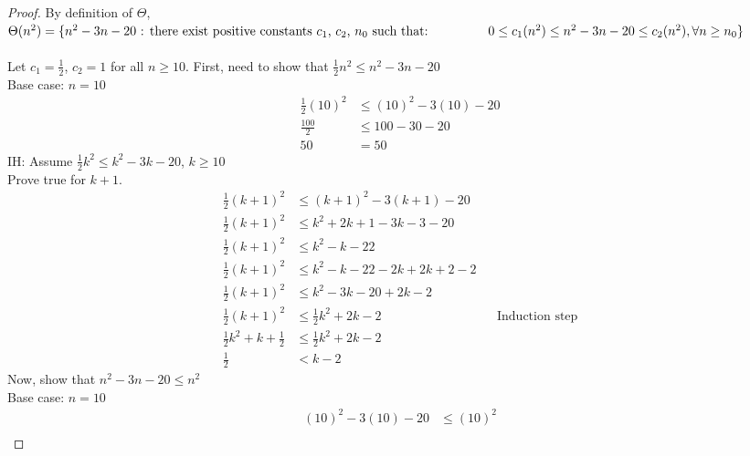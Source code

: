 \documentclass{article}
\begin{document}
\begin{enumerate}
                \begin{proof}
                    By definition of $\Theta$, \\$\Theta(n^2) = \{n^2-3n-20 \text{ : there exist positive constants } c_1 \text{, } c_2 \text{, } n_0 \text{ such that: }\\ 
                        \text{\hspace{1.5cm}}0\leq c_1(n^2)\leq n^2-3n-20\leq c_2(n^2), \forall n\geq n_0\}$
                    \\\\
                    Let $c_1 = \frac{1}{2}$, $c_2 = 1$ for all $n \geq 10$.
                    First, need to show that $\frac{1}{2}n^2\leq n^2-3n-20$\\
                    Base case: $n=10$
                    \begin{align*}
                        \frac{1}{2}(10)^2 &\leq (10)^2-3(10)-20\\
                        \frac{100}{2} &\leq 100-30-20\\
                        50 &= 50
                    \end{align*}
                    IH: Assume $\frac{1}{2}k^2 \leq k^2-3k-20$, $k\geq 10$\\
                    Prove true for $k+1$.
                    \begin{align*}
                        \frac{1}{2}(k+1)^2 &\leq (k+1)^2-3(k+1)-20\\
                        \frac{1}{2}(k+1)^2 &\leq k^2+2k+1-3k-3-20\\
                        \frac{1}{2}(k+1)^2 &\leq k^2-k-22 \\
                        \frac{1}{2}(k+1)^2 &\leq k^2-k-22-2k+2k+2-2 \\
                        \frac{1}{2}(k+1)^2 &\leq k^2-3k-20+2k-2 \\
                        \frac{1}{2}(k+1)^2 &\leq \frac{1}{2}k^2+2k-2 &&\text{Induction step}\\
                        \frac{1}{2}k^2 + k +\frac{1}{2} &\leq \frac{1}{2}k^2+2k-2 \\ 
                        \frac{1}{2} &< k-2
                    \end{align*}
                    Now, show that $n^2-3n-20\leq n^2$\\
                    Base case: $n=10$
                    \begin{align*}
                        (10)^2-3(10)-20 &\leq (10)^2 \\

\end{align*}
\end{proof}
\end{enumerate}
\end{document}

